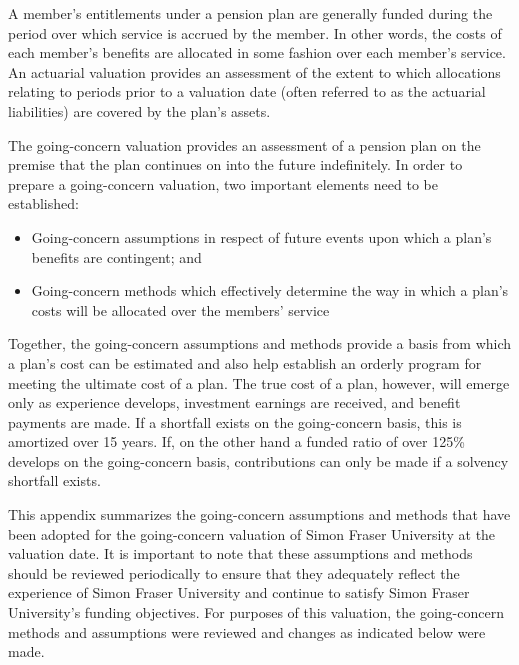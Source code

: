 \documentclass{report}
\begin{document}

A member's entitlements under a pension plan are generally funded during the period over which service is accrued by the member. In other words, the costs of each member's benefits are allocated in some fashion over each member's service. An actuarial valuation provides an assessment of the extent to which allocations relating to periods prior to a valuation date (often referred to as the actuarial liabilities) are covered by the plan's assets.

\vspace{3mm}
The going-concern valuation provides an assessment of a pension plan on the premise that the plan continues on into the future indefinitely. In order to prepare a going-concern valuation, two important elements need to be established:

\begin{itemize}
\item Going-concern assumptions in respect of future events upon which a plan's benefits are contingent; and
\item Going-concern methods which effectively determine the way in which a plan's costs will be allocated over the members' service
\end{itemize}

\vspace{3mm}
Together, the going-concern assumptions and methods provide a basis from which a plan's cost can be estimated and also help establish an orderly program for meeting the ultimate cost of a plan. The true cost of a plan, however, will emerge only as experience develops, investment earnings are received, and benefit payments are made. If a shortfall exists on the going-concern basis, this is amortized over 15 years. If, on the other hand a funded ratio of over 125\% develops on the going-concern basis, contributions can only be made if a solvency shortfall exists.

\vspace{3mm}
This appendix summarizes the going-concern assumptions and methods that have been adopted for the going-concern valuation of Simon Fraser University at the valuation date. It is important to note that these assumptions and methods should be reviewed periodically to ensure that they adequately reflect the experience of Simon Fraser University and continue to satisfy Simon Fraser University's funding objectives. For purposes of this valuation, the going-concern methods and assumptions were reviewed and changes as indicated below were made.
\end{document}
